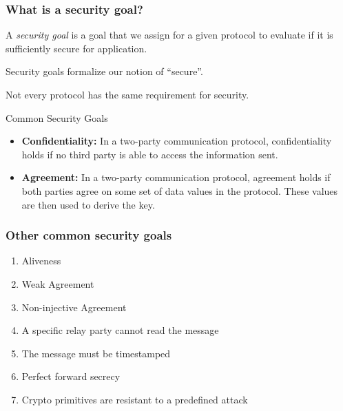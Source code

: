 \begin{frame}\frametitle{What is a security goal?}
\pause
A \emph{security goal} is a goal that we assign for a given protocol to evaluate if it is sufficiently secure for application.

\pause
Security goals formalize our notion of ``secure''.

\bigskip
\pause
Not every protocol has the same requirement for security.

Common Security Goals
\begin{itemize}
\pause
\item \textbf{Confidentiality:} In a two-party communication protocol, confidentiality holds if no third party is able to access the information sent.

\pause
\item \textbf{Agreement:} In a two-party communication protocol, agreement holds if both parties agree on some set of data values in the protocol.
These values are then used to derive the key.
\end{itemize}

\end{frame}

\begin{frame}\frametitle{Other common security goals}
\begin{enumerate}
\item Aliveness
\item Weak Agreement
\item Non-injective Agreement
\item A specific relay party cannot read the message
\item The message must be timestamped
\item Perfect forward secrecy
\item Crypto primitives are resistant to a predefined attack
\end{enumerate}
\end{frame}